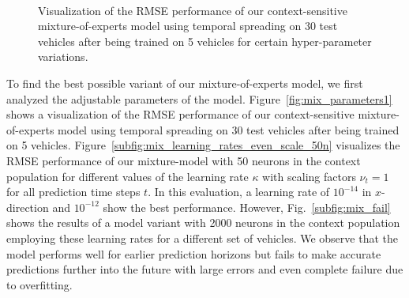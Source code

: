 \begin{figure}[t]
    \centering
    \\
    \caption{Visualization of the \ac{RMSE} performance of our context-sensitive mixture-of-experts model using temporal spreading on \num{30} test vehicles after being trained on \num{5} vehicles for certain hyper-parameter variations.}
    \label{fig:mix_parameters2}
\end{figure}

To find the best possible variant of our mixture-of-experts model, we first analyzed the adjustable parameters of the model. 
Figure~\ref{fig:mix_parameters1} shows a visualization of the \ac{RMSE} performance of our context-sensitive mixture-of-experts model using temporal spreading on \num{30} test vehicles after being trained on \num{5} vehicles.
Figure~\ref{subfig:mix_learning_rates_even_scale_50n} visualizes the \ac{RMSE} performance of our mixture-model with \num{50} neurons in the context population for different values of the learning rate $\kappa$ with scaling factors $\nu_{t}=1$ for all prediction time steps $t$.
In this evaluation, a learning rate of $10^{-14}$ in $x$-direction and $10^{-12}$ show the best performance.
However, Fig.~\ref{subfig:mix_fail} shows the results of a model variant with \num{2000} neurons in the context population employing these learning rates for a different set of vehicles.
We observe that the model performs well for earlier prediction horizons but fails to make accurate predictions further into the future with large errors and even complete failure due to overfitting.

